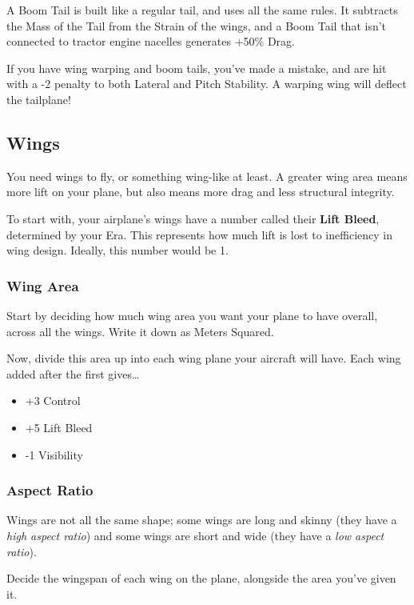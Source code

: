 \documentclass{article}
\begin{document}
A Boom Tail is built like a regular tail, and uses all the same rules.
It subtracts the Mass of the Tail from the Strain of the wings, and a
Boom Tail that isn't connected to tractor engine nacelles generates
+50\% Drag.

If you have wing warping and boom tails, you've made a mistake, and are
hit with a -2 penalty to both Lateral and Pitch Stability. A warping
wing will deflect the tailplane!

\subsection{Wings}
\label{_Wings}

You need wings to fly, or something wing-like at least. A greater wing
area means more lift on your plane, but also means more drag and less
structural integrity.

To start with, your airplane's wings have a number called their
\textbf{Lift Bleed}, determined by your Era. This represents how much
lift is lost to inefficiency in wing design. Ideally, this number would
be 1.

\subsubsection{Wing Area}
\label{_Wing_Area}

Start by deciding how much wing area you want your plane to have
overall, across all the wings. Write it down as Meters Squared.

Now, divide this area up into each wing plane your aircraft will have.
Each wing added after the first gives\ldots{}

\begin{itemize}
  \item          +3 Control
  \item          +5 Lift Bleed
  \item          -1 Visibility
\end{itemize}

\subsubsection{Aspect Ratio}
\label{_Aspect Ratio}

Wings are not all the same shape; some wings are long and skinny (they
have a \emph{high aspect ratio}) and some wings are short and wide (they
have a \emph{low aspect ratio}).

Decide the wingspan of each wing on the plane, alongside the area you've
given it.
\end{document}
